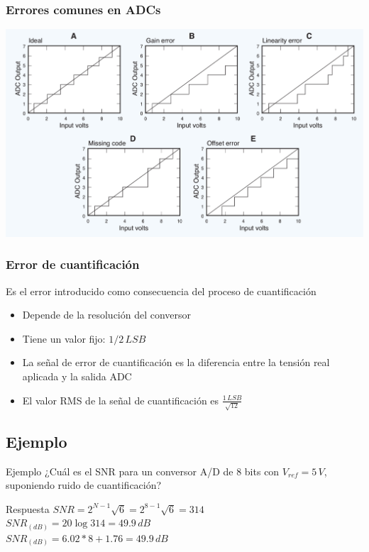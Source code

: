 \documentclass{beamer}
\begin{document}
\begin{frame}
\frametitle{Errores comunes en ADCs}
\begin{center}
\includegraphics[width=\textwidth]{d3/adc_common_errors}
\end{center}
\end{frame}

\begin{frame}
\frametitle{Error de cuantificación}
\begin{exampleblock}{}
Es el error introducido como consecuencia del proceso de cuantificación
\end{exampleblock}
\begin{exampleblock}{}
\begin{itemize}
\item Depende de la resolución del conversor
\item Tiene un valor fijo: \alert{$1/2\,LSB$}
\item La señal de error de cuantificación es la diferencia entre la
tensión real aplicada y la salida ADC
\item El valor RMS de la señal de cuantificación es
$\frac{1\,LSB}{\sqrt{12}}$
\end{itemize}
\end{exampleblock}
\end{frame}

\subsection{Ejemplo}
\begin{frame}
\begin{exampleblock}{Ejemplo}
¿Cuál es el SNR para un conversor A/D de 8 bits con $V_{ref} = 5\,V$,
suponiendo ruido de cuantificación?
\end{exampleblock}\pause
\begin{block}{Respuesta}
$SNR = 2^{N-1}\sqrt{6} = 2^{8-1}\sqrt{6} = 314$ \\
\vspace*{5mm}
$SNR_{(dB)} = 20\log{314} = 49.9\,dB$ \\
\vspace*{5mm}
$SNR_{(dB)} = 6.02*8 + 1.76 = 49.9\,dB$ \\
\end{block}
\end{frame}
\end{document}
